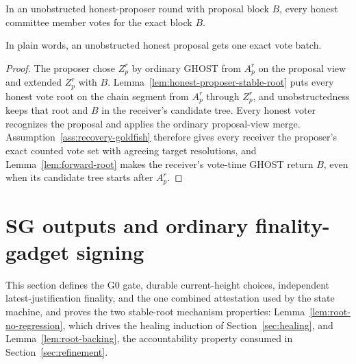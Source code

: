 \begin{lemma}
\label{lem:honest-proposer-votes}
In an unobstructed honest-proposer round with proposal block \(B\), every
honest committee member votes for the exact block \(B\).

In plain words, an unobstructed honest proposal gets one exact vote batch.
\end{lemma}

\begin{proof}
The proposer chose \(Z_p^r\) by ordinary GHOST from \(A_p^r\) on the
proposal view and extended \(Z_p^r\) with \(B\).
Lemma~\ref{lem:honest-proposer-stable-root} puts every honest vote root on
the chain segment from \(A_p^r\) through \(Z_p^r\), and unobstructedness keeps
that root and \(B\) in the receiver's candidate tree.  Every honest voter
recognizes the proposal and applies the ordinary proposal-view merge.
Assumption~\ref{ass:recovery-goldfish} therefore gives every receiver the
proposer's exact counted vote set with agreeing target resolutions, and
Lemma~\ref{lem:forward-root} makes the
receiver's vote-time GHOST return \(B\), even when its candidate tree
starts after \(A_p^r\).
\end{proof}


\section{SG outputs and ordinary finality-gadget signing}\label{sec:finality-votes}

This section defines the G0 gate, durable current-height choices, independent
latest-justification finality, and the one combined attestation used by the
state machine, and proves the two stable-root mechanism properties:
Lemma~\ref{lem:root-no-regression}, which drives the healing induction
of Section~\ref{sec:healing}, and Lemma~\ref{lem:root-backing}, the
accountability property consumed in Section~\ref{sec:refinement}.

